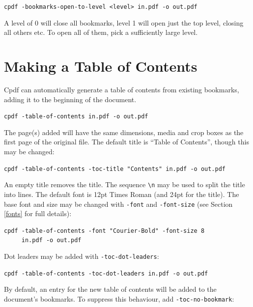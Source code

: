 \documentclass{book}
\begin{document}
  \begin{framed}
   \noindent\small\verb!cpdf -bookmarks-open-to-level <level> in.pdf -o out.pdf!
  \end{framed}

\noindent A level of 0 will close all bookmarks, level 1 will open just the top level, closing all others etc. To open all of them, pick a sufficiently large level.


\section{Making a Table of Contents}

Cpdf can automatically generate a table of contents from existing bookmarks, adding it to the beginning of the document.

  \begin{framed}
   \noindent\small\verb!cpdf -table-of-contents in.pdf -o out.pdf!
  \end{framed}

\noindent The page(s) added will have the same dimensions, media and crop boxes as the first page of the original file. The default title is ``Table of Contents'', though this may be changed:

  \begin{framed}
   \noindent\small\verb!cpdf -table-of-contents -toc-title "Contents" in.pdf -o out.pdf!
  \end{framed}

\noindent An empty title removes the title. The sequence \texttt{\textbackslash n} may be used to split the title into lines. The default font is 12pt Times Roman (and 24pt for the title). The base font and size may be changed with \texttt{-font} and \texttt{-font-size} (see Section \ref{fonts} for full details):

  \begin{framed}
   \noindent\small\verb!cpdf -table-of-contents -font "Courier-Bold" -font-size 8!\\
   \noindent\small\verb!     in.pdf -o out.pdf!
  \end{framed}

\noindent Dot leaders may be added with \texttt{-toc-dot-leaders}:

  \begin{framed}
   \noindent\small\verb!cpdf -table-of-contents -toc-dot-leaders in.pdf -o out.pdf!
  \end{framed}

\noindent By default, an entry for the new table of contents will be added to the document's bookmarks. To suppress this behaviour, add \texttt{-toc-no-bookmark}:
\end{document}

